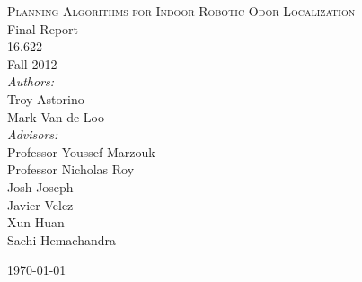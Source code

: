 \begin{titlepage}

\begin{center}

\vspace*{3cm}

\textsc{{\Huge Planning Algorithms for Indoor Robotic Odor Localization}}\\[3cm]

{\Large Final Report}\\
{\large 16.622}\\
{\large Fall 2012}\\
[1.5cm]



\emph{Authors:}\\
Troy Astorino\\
Mark Van de Loo\\
[1.5cm]

\emph{Advisors:}\\
Professor Youssef Marzouk\\
Professor Nicholas Roy\\
Josh Joseph\\
Javier Velez\\
Xun Huan\\
Sachi Hemachandra


\end{center}
\vfill

\today
\end{titlepage}